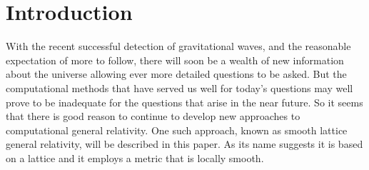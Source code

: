 \documentclass[a4paper,12pt]{article}
\numberwithin{equation}{section}
\begin{document}
\title{\Title}
\author{%
\Author\\[10pt]%
School of Mathematical Sciences\\%
Monash University, 3800\\%
Australia}
\date{26-Mar-2016}%
\date{5-Feb-2017}%
\date{13-Feb-2017}%
\date{1-Mar-2017}%

\maketitle

\begin{abstract}
\noindent
Numerical results, based on a lattice method for computational general relativity, will be
presented for Cauchy evolution of initial data for the Brill, Teukolsky and polarised Gowdy
space-times. The simple objective of this paper is to demonstrate that the lattice method
can, at least for these space-times, match results obtained from contemporary methods. Some
of the issues addressed in this paper include the handling of axisymmetric instabilities (in
the Brill space-time) and an implementation of a Sommerfeld radiation condition for the
Brill and Teukolsky space-times. It will be shown that the lattice method performs
particularly well in regard to the passage of the waves through the outer boundary.
Questions concerning multiple black-holes, mesh refinement and long term stability will not
be discussed here but may form the basis of future work.
\end{abstract}

\section{Introduction}
\label{sec:Intro}

With the recent successful detection of gravitational waves, and the reasonable expectation
of more to follow, there will soon be a wealth of new information about the universe
allowing ever more detailed questions to be asked. But the computational methods that have
served us well for today's questions may well prove to be inadequate for the questions that
arise in the near future. So it seems that there is good reason to continue to develop new
approaches to computational general relativity. One such approach, known as smooth lattice
general relativity, will be described in this paper. As its name suggests it is based on a
lattice and it employs a metric that is locally smooth.
\end{document}
